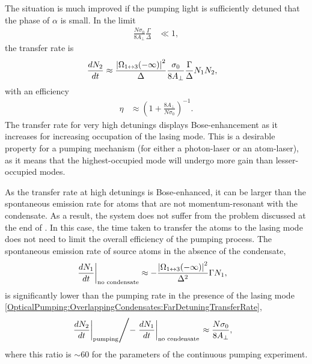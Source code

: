 The situation is much improved if the pumping light is sufficiently detuned that the phase of $\alpha$ is small.  In the limit
\begin{align}
    \frac{N \sigma_0}{8 A_\perp} \frac{\Gamma}{\Delta} &\ll 1,
\end{align}
the transfer rate is
\begin{align}
    \frac{d N_2}{dt} &\approx \frac{\abs{\Omega_{1\leftrightarrow 3}(-\infty)}^2}{\Delta} \frac{\sigma_0}{8 A_\perp} \frac{\Gamma}{\Delta} N_1 N_2, \label{OpticalPumping:OverlappingCondensates:FarDetuningTransferRate}
\end{align}
with an efficiency
\begin{align}
    \eta &\approx \left(1 + \frac{8 A_\perp}{N \sigma_0}\right)^{-1}.
\end{align}
The transfer rate for very high detunings displays Bose-enhancement as it increases for increasing occupation of the lasing mode.  This is a desirable property for a pumping mechanism (for either a photon-laser or an atom-laser), as it means that the highest-occupied mode will undergo more gain than lesser-occupied modes.

As the transfer rate at high detunings is Bose-enhanced, it can be larger than the spontaneous emission rate for atoms that are not momentum-resonant with the condensate.  As a result, the system does not suffer from the problem discussed at the end of .  In this case, the time taken to transfer the atoms to the lasing mode does not need to limit the overall efficiency of the pumping process.  The spontaneous emission rate of source atoms in the absence of the condensate,
\begin{align}
    \left. \frac{d N_1}{dt} \right|_\text{no condensate} &\approx - \frac{\left|\Omega_{1\leftrightarrow 3}(-\infty)\right|^2}{\Delta^2}\Gamma N_1,
\end{align}
is significantly lower than the pumping rate in the presence of the lasing mode \eqref{OpticalPumping:OverlappingCondensates:FarDetuningTransferRate},
\begin{align}
    \left. \left. \frac{d N_2}{dt} \right|_\text{pumping} \middle / - \left. \frac{d N_1}{dt} \right|_\text{no condensate} \right. &\approx \frac{N \sigma_0}{8 A_\perp},
\end{align}
where this ratio is $\sim 60$ for the parameters of the continuous pumping experiment.

